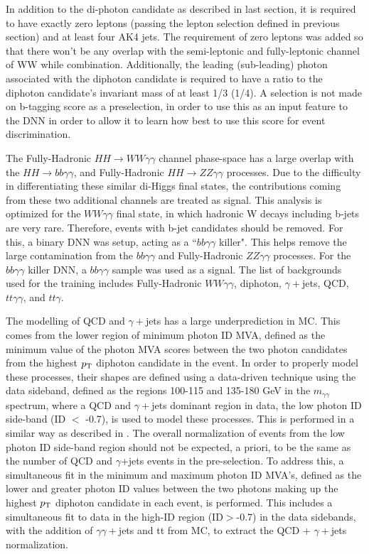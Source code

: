 In addition to the di-photon candidate as described in last section, it is required to have exactly zero leptons (passing the lepton selection defined in previous section) and at least four AK4 jets.
The requirement of zero leptons was added so that there won't be any overlap with the semi-leptonic and fully-leptonic channel of WW while combination.
Additionally, the leading (sub-leading) photon \pt associated with the diphoton candidate is required to have a ratio to the diphoton candidate's 
invariant mass of at least 1/3 (1/4). A selection is not made on b-tagging score as a preselection, in order to use this as an input feature to the DNN in order to allow it to learn how best to use this score for event discrimination.

The Fully-Hadronic $HH\rightarrow WW\gamma\gamma$ channel phase-space has a large overlap with the $HH\rightarrow bb\gamma\gamma$,
and Fully-Hadronic $HH\rightarrow ZZ\gamma\gamma$ processes. Due to the difficulty in differentiating these similar di-Higgs final states, the contributions coming from these two additional channels
are treated as signal. This analysis is optimized for the $WW\gamma\gamma$ final state, in which hadronic W decays including b-jets are very rare. Therefore, events with b-jet candidates should be removed.
For this, a binary DNN was setup, acting as a ``$bb\gamma\gamma$ killer".
This helps remove the large contamination from the $bb\gamma\gamma$ and Fully-Hadronic $ZZ\gamma\gamma$ processes.
For the $bb\gamma\gamma$ killer DNN, a $bb\gamma\gamma$ sample was used as a signal. The list
of backgrounds used for the training includes Fully-Hadronic $WW\gamma\gamma$, diphoton, $\gamma+$jets, QCD, $tt\gamma\gamma$, and $tt\gamma$.

The modelling of QCD and $\gamma+$jets has a large underprediction in MC. This comes from the lower region of minimum photon ID MVA, defined as the minimum value of the photon MVA scores 
between the two photon candidates from the highest $p_{\mathrm{T}}$ diphoton candidate in the event. In order to properly model these processes,
their shapes are defined using a data-driven technique using the data sideband, defined as the regions 100-115 and 135-180 GeV in the $m_{\gamma\gamma}$ spectrum, 
where a QCD and $\gamma+$jets dominant region in data, the low photon ID side-band (ID $<$ -0.7), is used to model these processes. 
This is performed in a similar way as described in \cite{Sirunyan:2020sum}.
The overall normalization of events from the low photon ID
side-band region should not be expected, a priori, to be the same as the number of QCD and $\gamma$+jets events in the pre-selection.
To address this, a simultaneous fit in the minimum and maximum photon ID MVA's, defined as the lower and greater photon ID values between the two photons making up the 
highest $p_{\mathrm{T}}$ diphoton candidate in each event, is performed. This includes a simultaneous fit to data in the high-ID region (ID$>$-0.7) in the data sidebands, with the addition of 
$\gamma\gamma+$jets and tt from MC, to extract the QCD $+$ $\gamma+$jets normalization.


